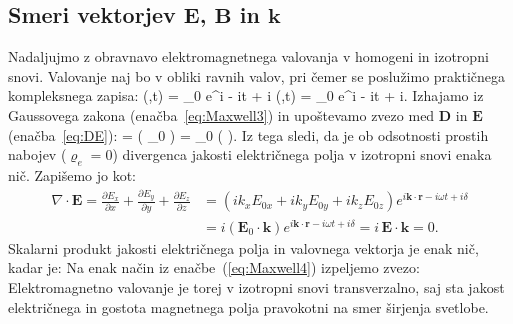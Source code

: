 \subsection*{Smeri vektorjev $\mathbf{E}$, $\mathbf{B}$ in $\mathbf{k}$}
Nadaljujmo z obravnavo elektromagnetnega valovanja v homogeni in izotropni snovi. 
Valovanje naj bo v obliki ravnih valov, pri čemer se poslužimo praktičnega kompleksnega zapisa:
\beq
{}(,t) = _0 e^{i\cdot {} - i\omega t + i\delta}
\qquad {} \qquad
{}(,t) = _0 e^{i\cdot {} - i\omega t + i\delta}.
\label{eq:ravnivalkompleks}
\eeq
Izhajamo iz Gaussovega zakona (enačba~\ref{eq:Maxwell3}) in upoštevamo zvezo med 
$\mathbf{D}$ in $\mathbf{E}$ (enačba~\ref{eq:DE}): 
\beq
\nabla \cdot {} = \nabla \cdot \left( \varepsilon \varepsilon_0 \right) 
= \varepsilon \varepsilon_0 \left(\nabla \cdot {} \right)\!.
\label{eq:03_20}
\eeq
Iz tega sledi, da je ob odsotnosti prostih nabojev ($\varrho_{e} = 0$) divergenca 
jakosti električnega polja v izotropni snovi enaka nič.
Zapišemo jo kot:
\begin{align}
\nabla \cdot \mathbf{E} = \frac{\partial E_x}{\partial x}+ \frac{\partial E_y}{\partial y}+
\frac{\partial E_z}{\partial z} &= \left(ik_xE_{0x} + ik_yE_{0y} + ik_zE_{0z}\right)
e^{i\mathbf{k}\cdot \mathbf{r} - i\omega t + i\delta}\nonumber\\
&= i \left( \mathbf{E}_0 \cdot \mathbf{k} \right) e^{i\mathbf{k}\cdot \mathbf{r} - i\omega t + i\delta} = 
i\, \mathbf{E} \cdot \mathbf{k} = 0.
\label{eq:03_21}
\end{align}
Skalarni produkt jakosti električnega polja in valovnega vektorja je enak nič, kadar je:
Na enak način iz enačbe~(\ref{eq:Maxwell4}) izpeljemo zvezo:
Elektromagnetno valovanje je torej v izotropni snovi transverzalno, saj sta jakost
električnega in gostota magnetnega polja pravokotni na smer širjenja svetlobe.

